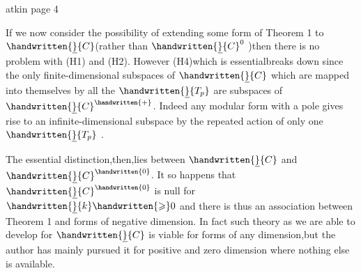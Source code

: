\begin{center}atkin page 4\end{center}

If we now consider the possibility of extending some form of Theorem 1 to $\handwritten{\underline}{C}$(rather than $\handwritten{\underline}{C}^{0}$ )then there is no problem with (H1) and (H2). However\deleted{\unsure{,}} (H4)\handwritten{,}which is essential\handwritten{,}breaks down since the only finite-dimensional subspaces of $\handwritten{\underline}{C}$ which are mapped into themselves by all the $\handwritten{\underline}{T_p}$ are subspaces of $\handwritten{\underline}{C}^{\handwritten{+}}$. Indeed any modular form with a pole gives rise to an infinite-dimensional subspace by the repeated action of only one $\handwritten{\underline}{T_p}$ .

The essential distinction,then,lies between $\handwritten{\underline}{C}$ and $\handwritten{\underline}{C}^{\handwritten{0}}$. It so happens that $\handwritten{\underline}{C}^{\handwritten{0}}$ is null for $\handwritten{\underline}{k}\handwritten{\geqslant}0$ and there is thus an association between Theorem 1 and forms of negative dimension. In fact such theory as we are able to develop for $\handwritten{\underline}{C}$ is viable for forms of any dimension,but the author has mainly pursued it for positive and zero dimension where nothing else is available.

